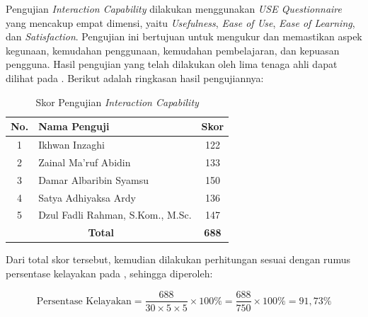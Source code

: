 Pengujian \textit{Interaction Capability} dilakukan menggunakan \textit{USE Questionnaire} yang mencakup empat dimensi, yaitu \textit{Usefulness}, \textit{Ease of Use}, \textit{Ease of Learning}, dan \textit{Satisfaction}. Pengujian ini bertujuan untuk mengukur dan memastikan aspek kegunaan, kemudahan penggunaan, kemudahan pembelajaran, dan kepuasan pengguna. Hasil pengujian  yang telah dilakukan oleh lima tenaga ahli dapat dilihat pada . Berikut adalah ringkasan hasil pengujiannya:

\begin{table}[H]
      \centering
      \caption{Skor Pengujian \textit{Interaction Capability}}
      \label{tab:skor-interaction-capability}
      \begin{tabular}{|c|p{8cm}|c|}
            \hline
            \textbf{No.}                         & \textbf{Nama Penguji}            & \textbf{Skor} \\
            \hline
            1                                    & Ikhwan Inzaghi                   & 122           \\
            \hline
            2                                    & Zainal Ma'ruf Abidin             & 133           \\
            \hline
            3                                    & Damar Albaribin Syamsu           & 150           \\
            \hline
            4                                    & Satya Adhiyaksa Ardy             & 136           \\
            \hline
            5                                    & Dzul Fadli Rahman, S.Kom., M.Sc. & 147           \\
            \hline
            \multicolumn{2}{|c|}{\textbf{Total}} & \textbf{688}                                     \\
            \hline
      \end{tabular}
\end{table}

Dari total skor tersebut, kemudian dilakukan perhitungan sesuai dengan rumus persentase kelayakan pada , sehingga diperoleh:

\begin{equation}
      \text{Persentase Kelayakan} = \frac{688}{30 \times 5 \times 5} \times 100\% = \frac{688}{750} \times 100\% = 91{,}73\%
\end{equation}


